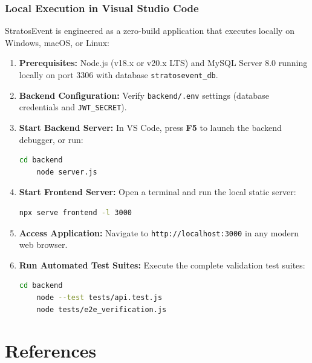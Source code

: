 \documentclass[11pt,a4paper]{report}
\begin{document}
\subsection{Local Execution in Visual Studio Code}
StratosEvent is engineered as a zero-build application that executes locally on Windows, macOS, or Linux:
\begin{enumerate}[leftmargin=1.5em, itemsep=0.4em]
    \item \textbf{Prerequisites:} Node.js (v18.x or v20.x LTS) and MySQL Server 8.0 running locally on port 3306 with database \texttt{stratosevent\_db}.
    \item \textbf{Backend Configuration:} Verify \texttt{backend/.env} settings (database credentials and \texttt{JWT\_SECRET}).
    \item \textbf{Start Backend Server:} In VS Code, press \textbf{F5} to launch the backend debugger, or run:
    \begin{lstlisting}[language=bash]
    cd backend
    node server.js
    \end{lstlisting}
    \item \textbf{Start Frontend Server:} Open a terminal and run the local static server:
    \begin{lstlisting}[language=bash]
    npx serve frontend -l 3000
    \end{lstlisting}
    \item \textbf{Access Application:} Navigate to \texttt{http://localhost:3000} in any modern web browser.
    \item \textbf{Run Automated Test Suites:} Execute the complete validation test suites:
    \begin{lstlisting}[language=bash]
    cd backend
    node --test tests/api.test.js
    node tests/e2e_verification.js
    \end{lstlisting}
\end{enumerate}

\newpage
\chapter*{References}
\end{document}

